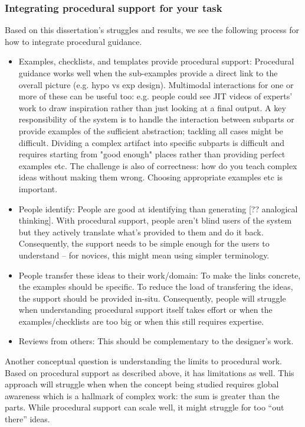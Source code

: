 \subsubsection{Integrating procedural support for your task}
Based on this dissertation's struggles and results, we see the following process for how to integrate procedural guidance. 

\begin{itemize}
\item Examples, checklists, and templates provide procedural support: Procedural guidance works well when the sub-examples provide a direct link to the overall picture (e.g. hypo vs exp design).  Multimodal interactions for one or more of these can be useful too: e.g. people could see JIT videos of experts' work to draw inspiration rather than just looking at a final output. A key responsibility of the system is to handle the interaction between subparts or  provide examples of the sufficient abstraction; tackling all cases might be difficult. Dividing a complex artifact into specific subparts is difficult and requires starting from "good enough" places rather than providing perfect examples etc. The challenge is also of correctness: how do you teach complex ideas without making them wrong. Choosing appropriate examples etc is important.
\item People identify: People are good at identifying than generating [?? analogical thinking]. With procedural support, people aren’t blind users of the system but they actively translate what’s provided to them and do it back. Consequently, the support needs to be simple enough for the users to understand -- for novices, this might mean using simpler terminology. 
\item People transfer these ideas to their work/domain: To make the links concrete, the examples should be specific. To reduce the load of transfering the ideas, the support should be provided in-situ. Consequently, people will struggle when understanding procedural support itself takes effort or when the examples/checklists are too big or when this still requires expertise. 
\item Reviews from others: This should be complementary to the designer's work.
\end{itemize}

Another conceptual question is understanding the limits to procedural work. Based on procedural support as described above, it has limitations as well. This approach will struggle when when the concept being studied requires global awareness which is a hallmark of complex work: the sum is greater than the parts.  While procedural support can scale well, it might struggle for too “out there” ideas.

